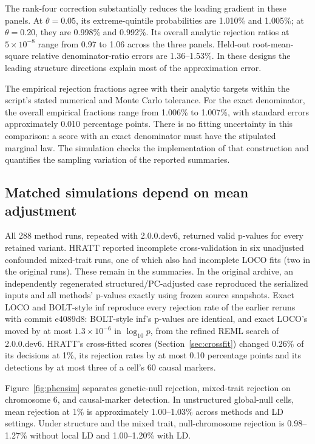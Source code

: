 \documentclass[11pt]{article}
\begin{document}
The rank-four correction substantially reduces the loading gradient in
these panels. At $\theta=0.05$, its extreme-quintile probabilities are
1.010\% and 1.005\%; at $\theta=0.20$, they are 0.998\% and 0.992\%.
Its overall analytic rejection ratios at $5\times10^{-8}$ range from
0.97 to 1.06 across the three panels. Held-out root-mean-square relative
denominator-ratio errors are 1.36--1.53\%. In these designs the leading
structure directions explain most of the approximation error.

The empirical rejection fractions agree with their analytic targets
within the script's stated numerical and Monte Carlo tolerance. For the
exact denominator, the overall empirical fractions range from 1.006\%
to 1.007\%, with standard errors approximately 0.010 percentage points.
There is no fitting uncertainty in this comparison: a score with an
exact denominator must have the stipulated marginal law. The simulation
checks the implementation of that construction and quantifies the
sampling variation of the reported summaries.

\subsection{Matched simulations depend on mean adjustment}
\label{sec:phensim-results}

All 288 method runs, repeated with 2.0.0.dev6, returned valid p-values for
every retained variant. HRATT reported incomplete cross-validation in six unadjusted confounded mixed-trait runs,
one of which also had incomplete LOCO fits (two in the original runs).
These remain in the summaries. In the original archive, an independently
regenerated structured/PC-adjusted case reproduced the serialized inputs
and all methods' p-values exactly using frozen source snapshots.
Exact LOCO and BOLT-style inf reproduce every rejection rate of the earlier
reruns with commit e4089d8: BOLT-style inf's p-values are identical, and exact
LOCO's moved by at most $1.3\times10^{-6}$ in $\log_{10}p$, from the
refined REML search of 2.0.0.dev6. HRATT's cross-fitted scores
(Section~\ref{sec:crossfit}) changed 0.26\% of its decisions at 1\%, its
rejection rates by at most 0.10 percentage points and its detections by at
most three of a cell's 60 causal markers.

Figure~\ref{fig:phensim} separates genetic-null rejection, mixed-trait
rejection on chromosome 6, and causal-marker detection. In unstructured
global-null cells, mean rejection at 1\% is approximately 1.00--1.03\%
across methods and LD settings. Under structure and the mixed trait,
null-chromosome rejection is 0.98--1.27\% without local LD and
1.00--1.20\% with LD.
\end{document}
